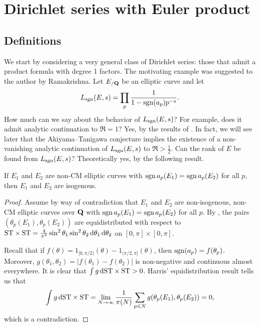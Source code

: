
\chapter{Dirichlet series with Euler product}\label{ch:Dirichlet-series}





\section{Definitions}

We start by considering a very general class of Dirichlet series: those that 
admit a product formula with degree 1 factors. The motivating example was 
suggested to the author by Ramakrishna. Let $E_{/\mathbf{Q}}$ be an elliptic 
curve and let 
\[
	L_{\operatorname{sgn}}(E,s) = \prod_p \frac{1}{1-\operatorname{sgn}(a_p) p^{-s}} .
\]
How much can we say about the behavior of $L_{\operatorname{sgn}}(E,s)$? For example, does it 
admit analytic continuation to $\Re = 1$? Yes, by the results of 
\cite[A.2]{serre-1989}. In fact, we will see later that the Akiyama--Tanigawa 
conjecture implies the existence of a non-vanishing analytic continuation of 
$L_{\operatorname{sgn}}(E,s)$ to $\Re > \frac 1 2$. Can the rank of $E$ be 
found from $L_{\operatorname{sgn}}(E,s)$? Theoretically yes, by the following result. 

\begin{theorem}
If $E_1$ and $E_2$ are non-CM elliptic curves with 
$\operatorname{sgn} a_p(E_1) = \operatorname{sgn} a_p(E_2)$ for all $p$, then $E_1$ and $E_2$ are 
isogenous.
\end{theorem}
\begin{proof}
Assume by way of contradiction that $E_1$ and $E_2$ are non-isogenous, non-CM 
elliptic curves over $\mathbf{Q}$ with $\operatorname{sgn} a_p(E_1) = \operatorname{sgn} a_p(E_2)$ for all $p$. By 
\cite[5.4]{harris-2009}, the pairs $(\theta_p(E_1),\theta_p(E_2))$ are 
equidistributed with respect to 
$\mathrm{ST}\times \mathrm{ST} = \frac{4}{\pi^2} \sin^2\theta_1\sin^2\theta_2\, \mathrm{d}\theta_1\, \mathrm{d}\theta_2$ 
on $[0,\pi]\times [0,\pi]$. 

Recall that if $f(\theta) = 1_{[0,\pi/2)}(\theta) - 1_{(\pi/2,\pi]}(\theta)$, 
then $\operatorname{sgn}(a_p) = f(\theta_p)$. Moreover, 
$g(\theta_1,\theta_2) = |f(\theta_1) - f(\theta_2)|$ is non-negative and 
continuous almost everywhere. It is clear that 
$\int g\, \mathrm{d} \mathrm{ST}\times \mathrm{ST} > 0$. Harris' equidistribution result tells us that 
\[
	\int g\, \mathrm{d} \mathrm{ST}\times\mathrm{ST} = \lim_{N\to \infty} \frac{1}{\pi(N)} \sum_{p\leqslant N} g(\theta_p(E_1),\theta_p(E_2)) = 0 ,
\]
which is a contradiction. 
\end{proof}

